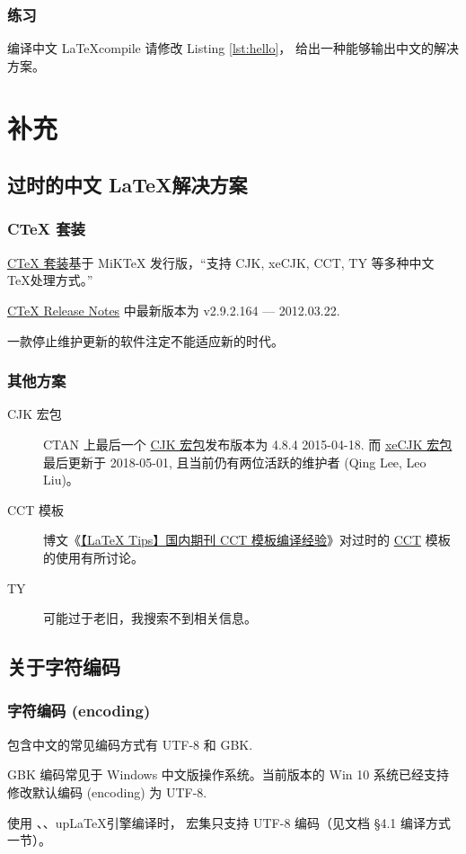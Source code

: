 \documentclass[final,aspectratio=32]{ctexbeamer}
\begin{document}
\begin{frame}
\frametitle{练习}
\begin{Ex}{编译中文 \LaTeX}{compile}
请修改 Listing \ref{lst:hello}， 给出一种能够输出中文的解决方案。
\end{Ex}
\end{frame}

\section{补充}
\subsection[过时的中文方案]{过时的中文 \LaTeX 解决方案}
\begin{frame}
\frametitle{CTeX 套装}
\href{http://www.ctex.org/CTeX}{CTeX 套装}基于 MiKTeX 发行版，“支持 CJK, xeCJK, CCT, TY 等多种中文 \TeX 处理方式。”

\href{http://www.ctex.org/CTeXReleaseNotes}{CTeX Release Notes} 中最新版本为 v2.9.2.164 --- 2012.03.22.

\alert{一款停止维护更新的软件注定不能适应新的时代。}
\end{frame}

\begin{frame}
\frametitle{其他方案}
\begin{description}
\item[CJK 宏包] CTAN 上最后一个 \href{https://www.ctan.org/pkg/cjk}{CJK 宏包}发布版本为 4.8.4 2015-04-18. 而 \href{https://www.ctan.org/pkg/xecjk}{xeCJK 宏包}最后更新于 2018-05-01, 且当前仍有两位活跃的维护者 (Qing Lee, Leo Liu)。
\item[CCT 模板] 博文《\href{https://liam.page/2013/10/15/LaTeX-CCT-template/}{【LaTeX Tips】国内期刊 CCT 模板编译经验}》对过时的 \href{ftp://ftp.cc.ac.cn/pub/cct/}{CCT} 模板的使用有所讨论。
\item[TY] 可能过于老旧，我搜索不到相关信息。
\end{description}
\end{frame}

\subsection{关于字符编码}
\begin{frame}
\frametitle{字符编码 (encoding)}
包含中文的常见编码方式有 UTF-8 和 GBK.

GBK 编码常见于 Windows 中文版操作系统。当前版本的 Win 10 系统已经支持修改默认编码 (encoding) 为 UTF-8.

使用 、、up\LaTeX 引擎编译时， \CTeX 宏集只支持 UTF-8 编码（见文档 \cite{ctex} \S 4.1 编译方式一节）。
\end{frame}
\end{document}
